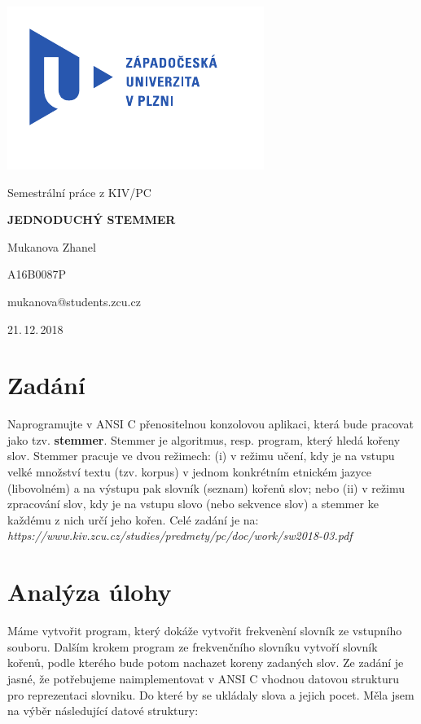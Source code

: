 \documentclass[11pt]{article}
\begin{document}
\begin{titlepage}
        \vspace*{-2cm}
        {\centering\includegraphics[scale=1.0]{logo.pdf}\par}
        \centering
        \vspace*{2cm}
        {\Large Semestrální práce z KIV/PC\par}
        \vspace{1.5cm}
        {\Huge\bfseries JEDNODUCHÝ STEMMER\par}
        \vspace{2cm}

        {\Large Mukanova Zhanel\par}
        {\Large A16B0087P\par}
        {\Large mukanova@students.zcu.cz\par}

        \vfill

        {\Large 21.\,12.\,2018}
\end{titlepage}


\section{Zadání}

Naprogramujte v ANSI C přenositelnou konzolovou aplikaci, která bude pracovat jako tzv.
\textbf{stemmer}. Stemmer je algoritmus, resp. program, který hledá kořeny slov. Stemmer pracuje ve
dvou režimech: (i) v režimu učení, kdy je na vstupu velké množství textu (tzv. korpus) v jednom
konkrétním etnickém jazyce (libovolném) a na výstupu pak slovník (seznam) kořenů slov; nebo
(ii) v režimu zpracování slov, kdy je na vstupu slovo (nebo sekvence slov) a stemmer ke každému
z nich určí jeho kořen.
Celé zadání je na: \emph{https://www.kiv.zcu.cz/studies/predmety/pc/doc/work/sw2018-03.pdf}	

\section{Analýza úlohy}
Máme vytvořit program, který dokáže vytvořit frekvenèní slovník ze vstupního souboru. Dalším krokem program ze frekvenčního slovníku vytvoří slovník kořenů, podle kterého bude potom nachazet koreny zadaných slov.
Ze zadání je jasné, že potřebujeme naimplementovat v ANSI C vhodnou datovou strukturu pro reprezentaci slovniku. Do které by se ukládaly slova a jejich pocet. Měla jsem na výběr následující datové struktury: 
\end{document}
